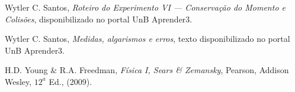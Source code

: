 \documentclass[12pt,a4paper]{article}
\begin{document}
\begin{thebibliography}{}
%

 Wytler C. Santos, {\it Roteiro do Experimento VI --- Conservação do Momento e
Colisões}, disponibilizado no portal UnB Aprender3.

 Wytler C. Santos, {\it Medidas, algarismos e erros}, texto disponibilizado
no portal UnB Aprender3.

 H.D. Young \& R.A. Freedman, {\it Física I, Sears \& Zemansky}, Pearson,
Addison Wesley, $12^a$ Ed., (2009).




\end{thebibliography}
\end{document}
